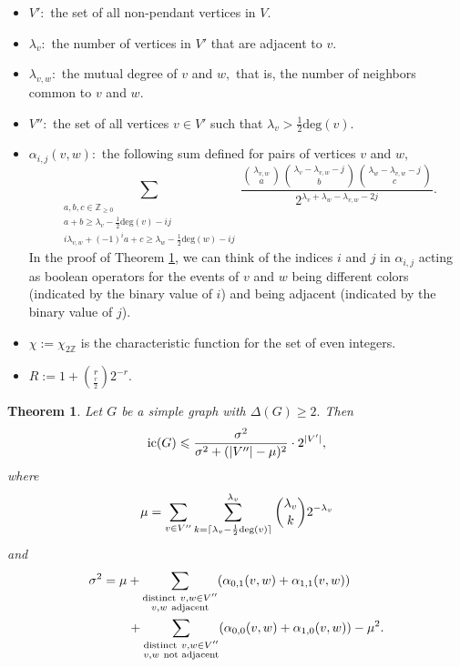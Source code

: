 \documentclass[11pt, reqno]{amsart}
\newtheorem{theorem}{Theorem} %
\theoremstyle{definition}
\def\Z{{\mathbb Z}}
\renewcommand{\leq}{\leqslant}
\renewcommand{\geq}{\geqslant}
\begin{document}
\begin{itemize}
\item $V':$ the set of all non-pendant vertices in $V.$
\item $\lambda_v:$ the number of vertices in $V'$ that are adjacent to $v.$
\item $\lambda_{v, w}:$ the mutual degree of $v$ and $w,$ that is, the number of neighbors common to $v$ and $w.$
\item $V'':$ the set of all vertices $v \in V'$ such that $\lambda_v > \frac{1}{2}\text{deg}(v).$
\item $\alpha_{i,j}(v, w):$ the following sum defined for pairs of vertices $v$ and $w,$
\[\sum_{\substack{a,b,c \in \mathbb{Z}_{\geq 0} \\ a + b \geq \lambda_v-\frac{1}{2}\text{deg}(v)-ij \\ i\lambda_{v,w}+(-1)^{i}a + c \geq \lambda_w - \frac{1}{2}\text{deg}(w)-ij}} \frac{\binom{\lambda_{v,w}}{a}\binom{\lambda_v-\lambda_{v,w}-j}{b}\binom{\lambda_w-\lambda_{v,w}-j}{c}}{2^{\lambda_v+\lambda_w-\lambda_{v,w}-2j}}.\]
In the proof of Theorem \ref{probabilisticmethod}, we can think of the indices $i$ and $j$ in $\alpha_{i,j}$ acting as boolean operators for the events of $v$ and $w$ being different colors (indicated by the binary value of $i$) and being adjacent (indicated by the binary value of $j$).
\item $\chi := \chi_{2\Z}$ is the characteristic function for the set of even integers.
\item $R := 1+\binom{r}{\frac{r}{2}}2^{-r}.$
\end{itemize}

\begin{theorem}
\label{probabilisticmethod}
Let $G$ be a simple graph with $\Delta(G) \geq 2.$ Then
\[\textup{ic}(G) \leq \frac{\sigma^2}{\sigma^2+(|V''|-\mu)^2}\cdot2^{|V'|},\]
where
\[\mu = \sum_{v \in V''} \sum_{k = \lceil\lambda_v-\frac{1}{2}\textup{deg}(v)\rceil}^{\lambda_v} \binom{\lambda_v}{k}2^{-\lambda_v}\]
and
\begin{align*}
\sigma^2 &= \mu + \sum_{\substack{\textup{distinct}\ v, w \in V'' \\ v,w\ \textup{adjacent}}}(\alpha_{0,1}(v,w) + \alpha_{1,1}(v,w)) 
\\ & \hspace{2em}+ \sum_{\substack{\textup{distinct}\ v, w \in V'' \\ v,w\ \textup{not adjacent}}} (\alpha_{0,0}(v,w) + \alpha_{1,0}(v,w)) - \mu^2.
\end{align*}
\end{theorem}
\end{document}
